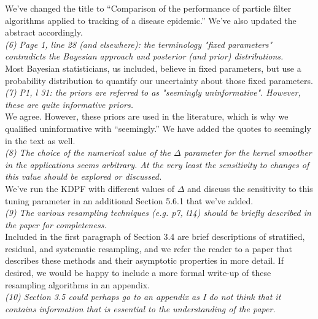 \documentclass{article}
\begin{document}
We've changed the title to ``Comparison of the performance of particle filter algorithms applied to tracking of a disease epidemic.'' We've also updated the abstract accordingly. \\

\noindent \emph{(6) Page 1, line 28 (and elsewhere): the terminology "fixed parameters" contradicts the Bayesian approach and posterior (and prior) distributions.} \\

Most Bayesian statisticians, us included, believe in fixed parameters, but use a probability distribution to quantify our uncertainty about those fixed parameters. \\

\noindent \emph{(7) P1, l 31: the priors are referred to as "seemingly uninformative". However, these are quite informative priors.} \\

We agree. However, these priors are used in the literature, which is why we qualified uninformative with ``seemingly.'' We have added the quotes to seemingly in the text as well. \\

\noindent \emph{(8) The choice of the numerical value of the $\Delta$ parameter for the kernel smoother in the applications seems arbitrary. At the very least the sensitivity to changes of this value should be explored or discussed.} \\

We've run the KDPF with different values of $\Delta$ and discuss the sensitivity to this tuning parameter in an additional Section 5.6.1 that we've added. \\

\noindent \emph{(9) The various resampling techniques (e.g. p7, l14) should be briefly described in the paper for completeness.} \\

Included in the first paragraph of Section 3.4 are brief descriptions of stratified, residual, and systematic resampling, and we refer the reader to a paper that describes these methods and their asymptotic properties in more detail. If desired, we would be happy to include a more formal write-up of these resampling algorithms in an appendix. \\

\noindent \emph{(10) Section 3.5 could perhaps go to an appendix as I do not think that it contains information that is essential to the understanding of the paper.} \\
\end{document}
